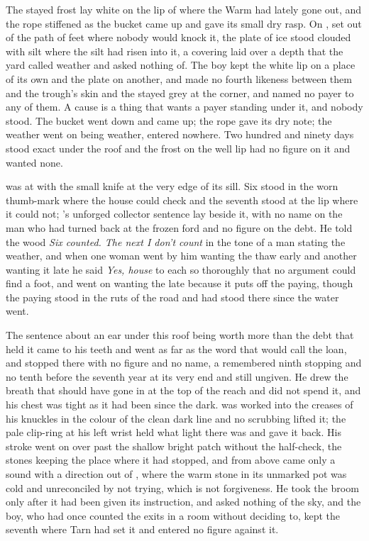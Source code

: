The stayed frost lay white on the lip of  where the Warm had lately gone out, and the rope stiffened as the bucket came up and gave its small dry rasp. On , set out of the path of feet where nobody would knock it, the plate of ice stood clouded with silt where the silt had risen into it, a covering laid over a depth that the yard called weather and asked nothing of. The boy kept the white lip on a place of its own and the plate on another, and made no fourth likeness between them and the trough's skin and the stayed grey at the corner, and named no payer to any of them. A cause is a thing that wants a payer standing under it, and nobody stood. The bucket went down and came up; the rope gave its dry note; the weather went on being weather, entered nowhere. Two hundred and ninety days stood exact under the roof and the frost on the well lip had no figure on it and wanted none.

\scenebreak

 was at  with the small knife at the very edge of its sill. Six stood in the worn thumb-mark where the house could check and the seventh stood at the lip where it could not; 's unforged collector sentence lay beside it, with no name on the man who had turned back at the frozen ford and no figure on the debt. He told the wood \emph{Six counted. The next I don't count} in the tone of a man stating the weather, and when one woman went by him wanting the thaw early and another wanting it late he said \emph{Yes, house} to each so thoroughly that no argument could find a foot, and went on wanting the late because it puts off the paying, though the paying stood in the ruts of the road and had stood there since the water went.

The sentence about an ear under this roof being worth more than the debt that held it came to his teeth and went as far as the word that would call the loan, and stopped there with no figure and no name, a remembered ninth stopping and no tenth before the seventh year at its very end and still ungiven. He drew the breath that should have gone in at the top of the reach and did not spend it, and his chest was tight as it had been since the dark.  was worked into the creases of his knuckles in the colour of the clean dark line and no scrubbing lifted it; the pale clip-ring at his left wrist held what light there was and gave it back. His stroke went on over  past the shallow bright patch without the half-check, the stones keeping the place where it had stopped, and from above came only a sound with a direction out of , where the warm stone in its unmarked pot was cold and unreconciled by not trying, which is not forgiveness. He took the broom only after it had been given its instruction, and asked nothing of the sky, and the boy, who had once counted the exits in a room without deciding to, kept the seventh where Tarn had set it and entered no figure against it.

